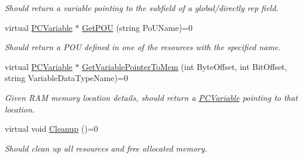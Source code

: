\begin{DoxyCompactItemize}
\begin{DoxyCompactList}\small\item\em Should return a variable pointing to the subfield of a global/directly rep field. \end{DoxyCompactList}\item 
virtual \hyperlink{classpc__emulator_1_1PCVariable}{P\+C\+Variable} $\ast$ \hyperlink{classpc__emulator_1_1PCConfiguration_a46c9b9b6e04aa198492704080b6c5b64}{Get\+P\+OU} (string Po\+U\+Name)=0
\begin{DoxyCompactList}\small\item\em Should return a P\+OU defined in one of the resources with the specified name. \end{DoxyCompactList}\item 
virtual \hyperlink{classpc__emulator_1_1PCVariable}{P\+C\+Variable} $\ast$ \hyperlink{classpc__emulator_1_1PCConfiguration_aa06ccda71fdb6b198dd3166e4cbcea95}{Get\+Variable\+Pointer\+To\+Mem} (int Byte\+Offset, int Bit\+Offset, string Variable\+Data\+Type\+Name)=0
\begin{DoxyCompactList}\small\item\em Given R\+AM memory location details, should return a \hyperlink{classpc__emulator_1_1PCVariable}{P\+C\+Variable} pointing to that location. \end{DoxyCompactList}\item 
virtual void \hyperlink{classpc__emulator_1_1PCConfiguration_a5440b0e7ce4034e79b0fb0ddae2a2b79}{Cleanup} ()=0\hypertarget{classpc__emulator_1_1PCConfiguration_a5440b0e7ce4034e79b0fb0ddae2a2b79}{}\label{classpc__emulator_1_1PCConfiguration_a5440b0e7ce4034e79b0fb0ddae2a2b79}

\begin{DoxyCompactList}\small\item\em Should clean up all resources and free allocated memory. \end{DoxyCompactList}\end{DoxyCompactItemize}

